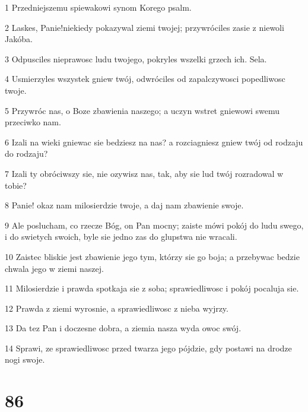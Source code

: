 \par 1 Przedniejszemu spiewakowi synom Korego psalm.
\par 2 Laskes, Panie!niekiedy pokazywal ziemi twojej; przywróciles zasie z niewoli Jakóba.
\par 3 Odpusciles nieprawosc ludu twojego, pokryles wszelki grzech ich. Sela.
\par 4 Usmierzyles wszystek gniew twój, odwróciles od zapalczywosci popedliwosc twoje.
\par 5 Przywróc nas, o Boze zbawienia naszego; a uczyn wstret gniewowi swemu przeciwko nam.
\par 6 Izali na wieki gniewac sie bedziesz na nas? a rozciagniesz gniew twój od rodzaju do rodzaju?
\par 7 Izali ty obróciwszy sie, nie ozywisz nas, tak, aby sie lud twój rozradowal w tobie?
\par 8 Panie! okaz nam milosierdzie twoje, a daj nam zbawienie swoje.
\par 9 Ale poslucham, co rzecze Bóg, on Pan mocny; zaiste mówi pokój do ludu swego, i do swietych swoich, byle sie jedno zas do glupstwa nie wracali.
\par 10 Zaistec bliskie jest zbawienie jego tym, którzy sie go boja; a przebywac bedzie chwala jego w ziemi naszej.
\par 11 Milosierdzie i prawda spotkaja sie z soba; sprawiedliwosc i pokój pocaluja sie.
\par 12 Prawda z ziemi wyrosnie, a sprawiedliwosc z nieba wyjrzy.
\par 13 Da tez Pan i doczesne dobra, a ziemia nasza wyda owoc swój.
\par 14 Sprawi, ze sprawiedliwosc przed twarza jego pójdzie, gdy postawi na drodze nogi swoje.

\chapter{86}

